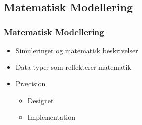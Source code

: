 \subsection{Matematisk Modellering}
\begin{frame}
	\frametitle{Matematisk Modellering}
	\begin{itemize}
		\item Simuleringer og matematisk beskrivelser
		\item Data typer som reflekterer matematik
		\item Præcision
		\begin{itemize}
			\item Designet
			\item Implementation
		\end{itemize}
	\end{itemize}
\end{frame}
